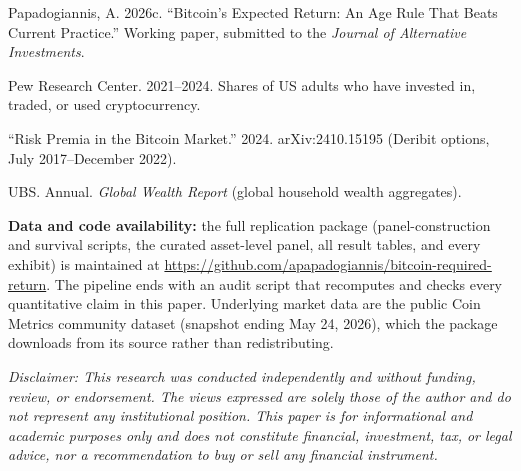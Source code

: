 \documentclass[11pt]{article}
\begin{document}
\begin{list}{}{\setlength{\itemindent}{-1.5em}\setlength{\leftmargin}{1.5em}\setlength{\itemsep}{2pt}\setlength{\parsep}{0pt}}
\item Papadogiannis, A. 2026c. ``Bitcoin's Expected Return: An Age Rule That Beats Current Practice.'' Working paper, submitted to the \emph{Journal of Alternative Investments}.
\item Pew Research Center. 2021--2024. Shares of US adults who have invested in, traded, or used cryptocurrency.
\item ``Risk Premia in the Bitcoin Market.'' 2024. arXiv:2410.15195 (Deribit options, July 2017--December 2022).
\item UBS. Annual. \emph{Global Wealth Report} (global household wealth aggregates).
\end{list}

\vspace{1em}
\noindent\textbf{Data and code availability:} the full replication package (panel-construction and survival scripts, the curated asset-level panel, all result tables, and every exhibit) is maintained at \url{https://github.com/apapadogiannis/bitcoin-required-return}. The pipeline ends with an audit script that recomputes and checks every quantitative claim in this paper. Underlying market data are the public Coin Metrics community dataset (snapshot ending May 24, 2026), which the package downloads from its source rather than redistributing.

\vspace{1em}
\noindent\textit{Disclaimer: This research was conducted independently and without funding, review, or endorsement. The views expressed are solely those of the author and do not represent any institutional position. This paper is for informational and academic purposes only and does not constitute financial, investment, tax, or legal advice, nor a recommendation to buy or sell any financial instrument.}
\end{document}
